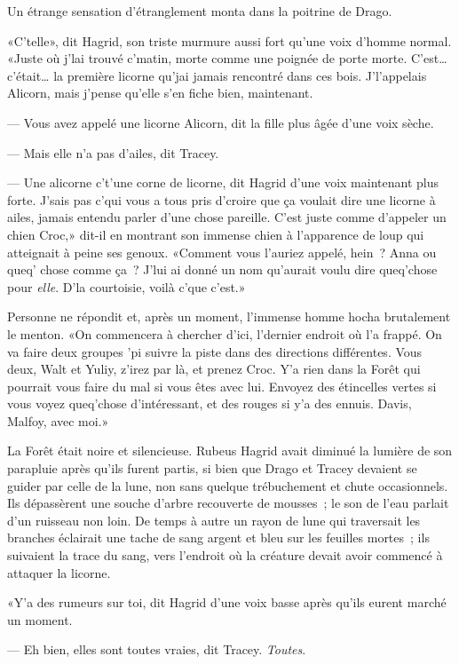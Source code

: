 Un étrange sensation d'étranglement monta dans la poitrine de Drago.

«C'telle», dit Hagrid, son triste murmure aussi fort qu'une voix d'homme normal. «Juste où j'lai trouvé c'matin, morte comme une poignée de porte morte. C'est… c'était… la première licorne qu'jai jamais rencontré dans ces bois. J'l'appelais Alicorn, mais j'pense qu'elle s'en fiche bien, maintenant.

--- Vous avez appelé une licorne Alicorn, dit la fille plus âgée d'une voix sèche.

--- Mais elle n'a pas d'ailes, dit Tracey.

--- Une alicorne c't'une corne de licorne, dit Hagrid d'une voix maintenant plus forte. J'sais pas c'qui vous a tous pris d'croire que ça voulait dire une licorne à ailes, jamais entendu parler d'une chose pareille. C'est juste comme d'appeler un chien Croc,» dit-il en montrant son immense chien à l'apparence de loup qui atteignait à peine ses genoux. «Comment vous l'auriez appelé, hein~? Anna ou queq' chose comme ça~? J'lui ai donné un nom qu'aurait voulu dire queq'chose pour \emph{elle}. D'la courtoisie, voilà c'que c'est.»

Personne ne répondit et, après un moment, l'immense homme hocha brutalement le menton. «On commencera à chercher d'ici, l'dernier endroit où l'a frappé. On va faire deux groupes 'pi suivre la piste dans des directions différentes. Vous deux, Walt et Yuliy, z'irez par là, et prenez Croc. Y'a rien dans la Forêt qui pourrait vous faire du mal si vous êtes avec lui. Envoyez des étincelles vertes si vous voyez queq'chose d'intéressant, et des rouges si y'a des ennuis. Davis, Malfoy, avec moi.»

La Forêt était noire et silencieuse. Rubeus Hagrid avait diminué la lumière de son parapluie après qu'ils furent partis, si bien que Drago et Tracey devaient se guider par celle de la lune, non sans quelque trébuchement et chute occasionnels. Ils dépassèrent une souche d'arbre recouverte de mousses~; le son de l'eau parlait d'un ruisseau non loin. De temps à autre un rayon de lune qui traversait les branches éclairait une tache de sang argent et bleu sur les feuilles mortes~; ils suivaient la trace du sang, vers l'endroit où la créature devait avoir commencé à attaquer la licorne.

«Y'a des rumeurs sur toi, dit Hagrid d'une voix basse après qu'ils eurent marché un moment.

--- Eh bien, elles sont toutes vraies, dit Tracey. \emph{Toutes}.

